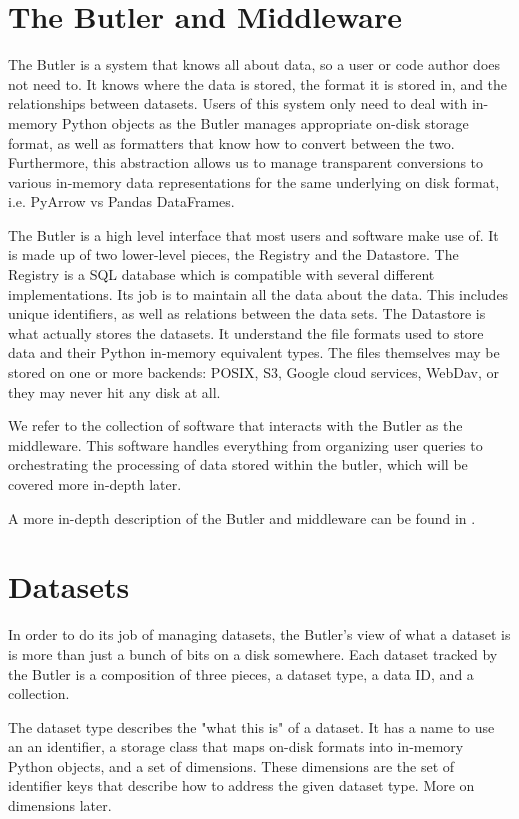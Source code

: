 \documentclass[11pt,twoside]{article}
\begin{document}
\section{The Butler and Middleware}
The Butler is a system that knows all about data, so a user or code author does not need to. It knows where the data is stored, the format it is stored in, and the relationships between datasets. Users of this system only need to deal with in-memory Python objects as the Butler manages appropriate on-disk storage format, as well as formatters that know how to convert between the two. Furthermore, this abstraction allows us to manage transparent conversions to various in-memory data representations for the same underlying on disk format, i.e. PyArrow vs Pandas DataFrames.

The Butler is a high level interface that most users and software make use of. It is made up of two lower-level pieces, the Registry and the Datastore. The Registry is a SQL database which is compatible with several different implementations. Its job is to maintain all the data about the data. This includes unique identifiers, as well as relations between the data sets. The Datastore is what actually stores the datasets. It understand the file formats used to store data and their Python in-memory equivalent types. The files themselves may be stored on one or more backends: POSIX, S3, Google cloud services, WebDav, or they may never hit any disk at all.

We refer to the collection of software that interacts with the Butler as the middleware. This software handles everything from organizing user queries to orchestrating the processing of data stored within the butler, which will be covered more in-depth later.

A more in-depth description of the Butler and middleware can be found in \citet{2022SPIE12189E..11J}.

\section{Datasets}
In order to do its job of managing datasets, the Butler's view of what a dataset is is more than just a bunch of bits on a disk somewhere. Each dataset tracked by the Butler is a composition of three pieces, a dataset type, a data ID, and a collection.

The dataset type describes the "what this is" of a dataset. It has a name to use an an identifier, a storage class that maps on-disk formats into in-memory Python objects, and a set of dimensions. These dimensions are the set of identifier keys that describe how to address the given dataset type. More on dimensions later.
\end{document}
